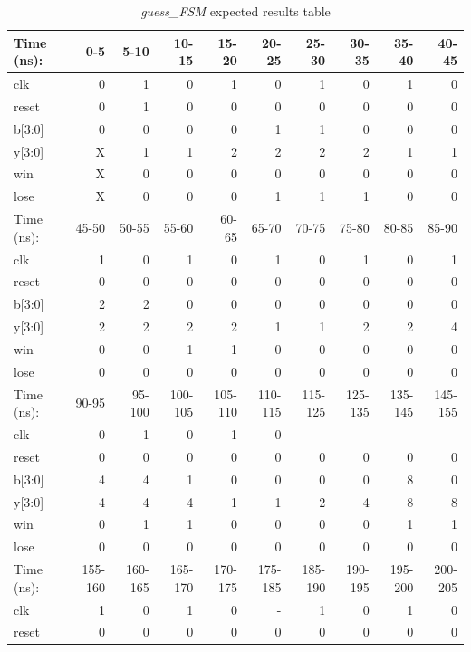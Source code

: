 \documentclass[11pt]{article}
\begin{document}
\begin{table}[ht]\centering
	\caption{\textit{guess\_FSM} expected results table}
	\label{ALU:tbl:alu_ERT}\medskip
	\begin{tabular}{l|rrrrrrrrr}
		Time (ns): & 0-5 & 5-10 & 10-15 & 15-20 & 20-25 & 25-30 & 30-35 & 35-40 & 40-45  \\
		\midrule
		clk & 0  & 1 & 0 & 1 & 0 & 1 & 0 & 1 & 0   \\
		reset & 0 & 1 & 0 & 0 & 0 & 0 & 0 & 0 & 0 \\
		b[3:0] & 0 & 0 & 0& 0 & 1 & 1 & 0 & 0 & 0   \\
		y[3:0] & X & 1 & 1 & 2 & 2 & 2 & 2 & 1 & 1   \\
		\midrule
		win & X & 0 & 0 & 0  & 0 & 0 & 0 & 0 & 0  \\
		lose & X & 0 & 0 & 0 & 1 & 1 & 1 & 0 & 0 \\
		\midrule
		Time (ns): & 45-50 & 50-55 & 55-60 & 60- 65 & 65-70 & 70-75 & 75-80 & 80-85 & 85-90   \\
		\midrule
		clk& 1 & 0 & 1 & 0 & 1 & 0 & 1 & 0 & 1 \\
		reset & 0 & 0 & 0 & 0 & 0 & 0 & 0 & 0 & 0 \\
		b[3:0] & 2 & 2 & 0 & 0 & 0 & 0 & 0 & 0 & 0  \\
		y[3:0] & 2 & 2 & 2 & 2 & 1 & 1 & 2 & 2 & 4  \\
		\midrule
		win & 0 & 0 & 1 & 1 & 0 & 0 & 0 & 0 & 0  \\
		lose & 0 & 0 & 0 & 0 & 0 & 0 & 0 & 0 & 0 \\
		\midrule
		Time (ns):& 90-95 & 95-100 & 100-105 & 105-110 & 110-115 & 115-125 & 125-135 & 135-145 & 145-155 \\
		\midrule
		clk & 0  & 1 & 0 & 1 & 0 & - & - & - & -  \\
		reset & 0 & 0 & 0 & 0 & 0 & 0 & 0 & 0 & 0\\
		b[3:0] & 4 & 4 & 1& 0 & 0 & 0 & 0 & 8 & 0 \\
		y[3:0] & 4 & 4 & 4 & 1 & 1 & 2 & 4 & 8 & 8 \\
		\midrule
		win & 0 & 1 & 1 & 0  & 0 & 0 & 0 & 1 & 1  \\
		lose & 0 & 0 & 0 & 0 & 0 & 0 & 0 & 0 & 0   \\
		\midrule
		Time (ns): & 155-160 & 160-165 & 165-170 & 170-175 & 175-185 & 185-190 & 190-195 & 195-200 & 200-205 \\
		\midrule
		clk & 1  & 0 & 1 & 0 & - & 1 & 0 & 1 & 0  \\
		reset & 0 & 0 & 0 & 0 & 0 & 0 & 0 & 0 & 0 \\

\end{tabular}
\end{table}
\end{document}
